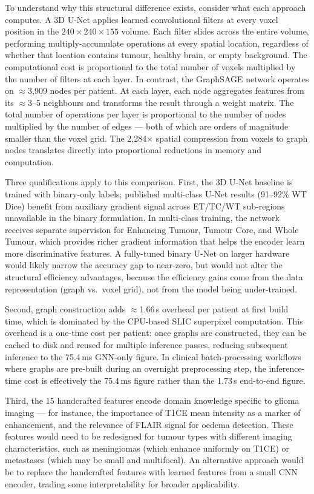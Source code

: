 \documentclass{article}
\begin{document}
To understand why this structural difference exists, consider what each approach
computes. A 3D U-Net applies learned convolutional filters at every voxel position
in the $240 \times 240 \times 155$ volume. Each filter slides across the entire
volume, performing multiply-accumulate operations at every spatial location,
regardless of whether that location contains tumour, healthy brain, or empty
background. The computational cost is proportional to the total number of voxels
multiplied by the number of filters at each layer. In contrast, the GraphSAGE
network operates on $\approx$3,909 nodes per patient. At each layer, each node
aggregates features from its $\approx$3--5 neighbours and transforms the result
through a weight matrix. The total number of operations per layer is proportional
to the number of nodes multiplied by the number of edges --- both of which are
orders of magnitude smaller than the voxel grid. The 2,284$\times$ spatial
compression from voxels to graph nodes translates directly into proportional
reductions in memory and computation.

Three qualifications apply to this comparison. First, the 3D U-Net baseline is
trained with binary-only labels; published multi-class U-Net results (91--92\% WT
Dice) benefit from auxiliary gradient signal across ET/TC/WT sub-regions unavailable
in the binary formulation. In multi-class training, the network receives separate
supervision for Enhancing Tumour, Tumour Core, and Whole Tumour, which provides
richer gradient information that helps the encoder learn more discriminative features.
A fully-tuned binary U-Net on larger hardware would likely narrow the accuracy gap
to near-zero, but would not alter the structural efficiency advantages, because the
efficiency gains come from the data representation (graph vs.\ voxel grid), not from
the model being under-trained.

Second, graph construction adds $\approx$1.66\,s overhead per patient at first build
time, which is dominated by the CPU-based SLIC superpixel computation. This overhead
is a one-time cost per patient: once graphs are constructed, they can be cached to
disk and reused for multiple inference passes, reducing subsequent inference to the
75.4\,ms GNN-only figure. In clinical batch-processing workflows where graphs are
pre-built during an overnight preprocessing step, the inference-time cost is
effectively the 75.4\,ms figure rather than the 1.73\,s end-to-end figure.

Third, the 15 handcrafted features encode domain knowledge specific to glioma
imaging --- for instance, the importance of T1CE mean intensity as a marker of
enhancement, and the relevance of FLAIR signal for oedema detection. These features
would need to be redesigned for tumour types with different imaging characteristics,
such as meningiomas (which enhance uniformly on T1CE) or metastases (which may be
small and multifocal). An alternative approach would be to replace the handcrafted
features with learned features from a small CNN encoder, trading some interpretability
for broader applicability.
\end{document}
